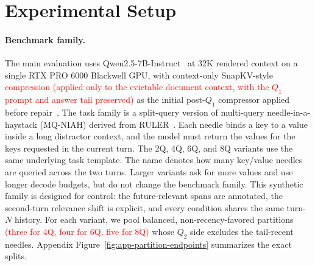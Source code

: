 \documentclass{article}
\begin{document}
\section{Experimental Setup}
\label{sec:setup}

\paragraph{Benchmark family.}
The main evaluation uses Qwen2.5-7B-Instruct~\citep{qwen} at 32K
rendered context on a single RTX PRO 6000 Blackwell GPU, with
context-only SnapKV-style \textcolor{red}{compression} \textcolor{red}{(applied
only to the evictable document context, with the $Q_1$ prompt and answer
tail preserved)} as the initial post-$Q_1$ compressor applied before
repair~\citep{snapkv}.
The task family is a split-query version of multi-query
needle-in-a-haystack (MQ-NIAH) derived from RULER~\citep{ruler}.
Each needle binds a key to a value inside a long distractor context, and
the model must return the values for the keys requested in the current
turn.
The 2Q, 4Q, 6Q, and 8Q variants use the same underlying task template.
The name denotes how many key/value needles are queried across the two
turns.
Larger variants ask for more values and use longer decode budgets, but
do not change the benchmark family.
This synthetic family is designed for control: the
future-relevant spans are annotated, the second-turn relevance shift is
explicit, and every condition shares the same turn-$N$ history.
For each variant, we pool balanced, non-recency-favored partitions
\textcolor{red}{(three for 4Q, four for 6Q, five for 8Q)} whose
$Q_2$ side excludes the tail-recent needles.
Appendix
Figure~\ref{fig:app-partition-endpoints} summarizes the exact splits.
\end{document}
